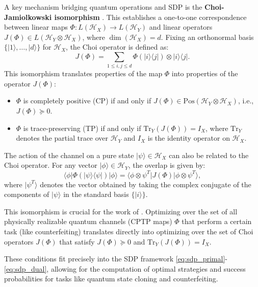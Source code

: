 \documentclass{article} %
\begin{document}
A key mechanism bridging quantum operations and SDP is the \textbf{Choi-Jamiolkowski isomorphism} \citep{Choi1975Completely, Jamiolkowski1972Linear}. This establishes a one-to-one correspondence between linear maps $\Phi: L(\mathcal{H}_X) \to L(\mathcal{H}_Y)$ and linear operators $J(\Phi) \in L(\mathcal{H}_Y \otimes \mathcal{H}_X)$, where $\dim(\mathcal{H}_X) = d$. Fixing an orthonormal basis $\{|1\rangle, \dots, |d\rangle\}$ for $\mathcal{H}_X$, the Choi operator is defined as:
\begin{equation}
    J(\Phi) = \sum_{1 \le i,j \le d} \Phi(|i\rangle\langle j|) \otimes |i\rangle\langle j|.
    \label{eq:choi_operator}
\end{equation}
This isomorphism translates properties of the map $\Phi$ into properties of the operator $J(\Phi)$:
\begin{itemize}
    \item $\Phi$ is completely positive (CP) if and only if $J(\Phi) \in \mathrm{Pos}(\mathcal{H}_Y \otimes \mathcal{H}_X)$, i.e., $J(\Phi) \succeq 0$.
    \item $\Phi$ is trace-preserving (TP) if and only if $\mathrm{Tr}_Y(J(\Phi)) = I_X$, where $\mathrm{Tr}_Y$ denotes the partial trace over $\mathcal{H}_Y$ and $I_X$ is the identity operator on $\mathcal{H}_X$.
\end{itemize}
The action of the channel on a pure state $|\psi\rangle \in \mathcal{H}_X$ can also be related to the Choi operator. For any vector $|\phi\rangle \in \mathcal{H}_Y$, the overlap is given by:
\begin{equation}
    \langle \phi | \Phi(|\psi\rangle\langle\psi|) | \phi \rangle = \langle \phi \otimes \psi^T | J(\Phi) | \phi \otimes \psi^T \rangle,
    \label{eq:choi_action}
\end{equation}
where $|\psi^T\rangle$ denotes the vector obtained by taking the complex conjugate of the components of $|\psi\rangle$ in the standard basis $\{|i\rangle\}$.

This isomorphism is crucial for the work of \citet{Molina2012Optimal}. Optimizing over the set of all physically realizable quantum channels (CPTP maps) $\Phi$ that perform a certain task (like counterfeiting) translates directly into optimizing over the set of Choi operators $J(\Phi)$ that satisfy $J(\Phi) \succeq 0$ and $\mathrm{Tr}_Y(J(\Phi)) = I_X$. 

These conditions fit precisely into the SDP framework \eqref{eq:sdp_primal}-\eqref{eq:sdp_dual}, allowing for the computation of optimal strategies and success probabilities for tasks like quantum state cloning and counterfeiting.
\end{document}
